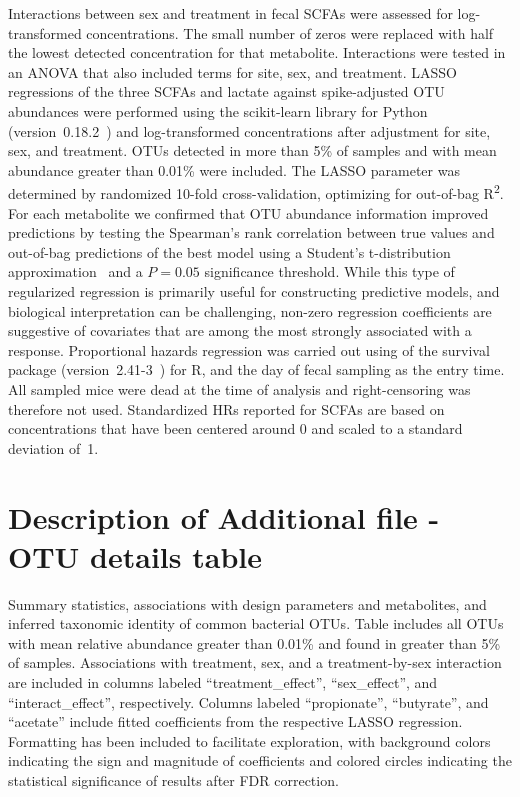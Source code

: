 \documentclass{doc/template/bmcart-nofigbox}
\begin{document}
Interactions between sex and treatment in fecal SCFAs were assessed for
log-transformed concentrations.
The small number of zeros were replaced with half the lowest detected
concentration for that metabolite.
Interactions were tested in an ANOVA that also included terms for site, sex,
and treatment.
LASSO regressions of the three SCFAs and lactate against spike-adjusted OTU
abundances were performed using the scikit-learn library for Python
(version~0.18.2~\cite{Pedregosa2012})
and log-transformed concentrations after adjustment
for site, sex, and treatment.
OTUs detected in more than 5\% of samples and with mean abundance greater
than 0.01\% were included.
The LASSO parameter was determined by randomized 10-fold cross-validation,
optimizing for out-of-bag R\textsuperscript{2}.
For each metabolite we confirmed that OTU abundance information improved
predictions by testing the Spearman's rank correlation
between true values and out-of-bag predictions of the best model using a
Student's t-distribution approximation~\cite{Iman1978} and a $P = 0.05$ significance
threshold.
While this type of regularized regression is primarily useful for constructing
predictive models, and biological interpretation can be challenging,
non-zero regression coefficients are suggestive of covariates that are among
the most strongly associated with a response.
Proportional hazards regression was carried out using of the
survival package (version~2.41-3~\cite{Therneau2015}) for R, and the day
of fecal sampling as the entry time.
All sampled mice were dead at the time of analysis and
right-censoring was therefore not used.
Standardized HRs reported for SCFAs are based on concentrations
that have been centered around 0 and scaled to a standard deviation of~1.


\FloatBarrier

\appendix

\section{Description of Additional file - OTU details table}\label{app:otu_details_table}

Summary statistics, associations with design parameters and metabolites, and
inferred taxonomic identity of common bacterial OTUs.
Table includes all OTUs with mean relative abundance greater than 0.01\% and
found in greater than 5\% of samples.
Associations with treatment, sex, and a treatment-by-sex interaction are
included in columns labeled ``treatment\_effect'', ``sex\_effect'', and
``interact\_effect'', respectively.
Columns labeled ``propionate'', ``butyrate'', and ``acetate'' include fitted
coefficients from the respective LASSO regression.
Formatting has been included to facilitate exploration, with background colors
indicating the sign and magnitude of coefficients and colored circles
indicating the statistical significance of results after FDR correction.
\end{document}
